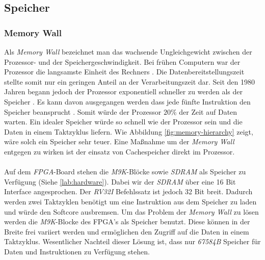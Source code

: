         \subsection{Speicher}
                
            \subsubsection{Memory Wall}
                Als \textit{Memory Wall} bezeichnet man das wachsende Ungleichgewicht zwischen der Prozessor- und der Speichergeschwindigkeit.
                Bei frühen Computern war der Prozessor die langsamste Einheit des Rechners \cite{memory-wall}.
                Die Datenbereitstellungszeit stellte somit nur ein geringen Anteil an der Verarbeitungszeit dar.
                Seit den 1980 Jahren begann jedoch der Prozessor exponentiell schneller zu werden als der Speicher \cite{memory-cpu-gap}.
                Es kann davon ausgegangen werden dass jede fünfte Instruktion den Speicher beansprucht \cite{memory-wall}.
                Somit würde der Prozessor $20\%$ der Zeit auf Daten warten. Ein idealer Speicher würde so schnell wie der Prozessor sein
                und die Daten in einem Taktzyklus liefern.
                Wie Abbildung \ref{fig:memory-hierarchy} zeigt, wäre solch ein Speicher sehr teuer.
                Eine Maßnahme um der \textit{Memory Wall} entgegen zu wirken ist der einsatz von Cachespeicher direkt im Prozessor.
                \\\\
                Auf dem \textit{FPGA}-Board stehen die \textit{M9K}-Blöcke sowie \textit{SDRAM} als Speicher zu Verfügung (Siehe \ref{lab:hardware}).
                Dabei wir der \textit{SDRAM} über eine 16 Bit Interface angesprochen. Der \textit{RV32I} Befehlssatz ist jedoch 32 Bit breit.
                Dadurch werden zwei Taktzyklen benötigt um eine Instruktion aus dem Speicher zu laden und würde den Softcore ausbremsen.
                Um das Problem der \textit{Memory Wall} zu lösen werden die \textit{M9K}-Blocke des FPGA's als Speicher benutzt.
                Diese können in der Breite frei variiert werden und ermöglichen den Zugriff auf die Daten in einem Taktzyklus.
                Wesentlicher Nachteil dieser Lösung ist, dass nur \textit{67584B} Speicher für Daten und Instruktionen zu Verfügung stehen.
                

